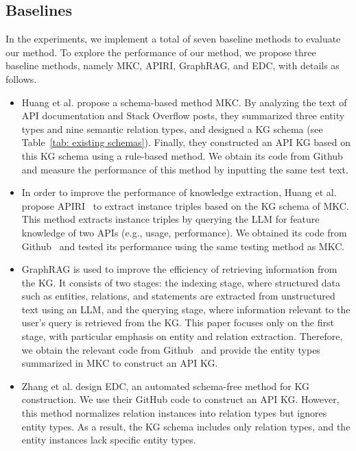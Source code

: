 \subsection{Baselines}\label{sec: baseline}
In the experiments, we implement a total of seven baseline methods to evaluate our method.
To explore the performance of our method, we propose three baseline methods, namely MKC, APIRI, GraphRAG, and EDC, with details as follows.
\begin{itemize}[leftmargin=*]
    \item Huang et al. \cite{Manual} propose a schema-based method MKC.
    By analyzing the text of API documentation and Stack Overflow posts, they summarized three entity types and nine semantic relation types, and designed a KG schema (see Table~\ref{tab: existing schemas}).
    Finally, they constructed an API KG based on this KG schema using a rule-based method. 
    We obtain its code from Github~\cite{yuangit} and measure the performance of this method by inputting the same test text.
    \item In order to improve the performance of knowledge extraction, Huang et al. propose APIRI~\cite{yanbang2} to extract instance triples based on the KG schema of MKC.
    This method extracts instance triples by querying the LLM for feature knowledge of two APIs (e.g., usage, performance).
    We obtained its code from Github~\cite{APIRICGIT} and tested its performance using the same testing method as MKC.
    \item GraphRAG \cite{GraphRAG} is used to improve the efficiency of retrieving information from the KG.
    It consists of two stages: the indexing stage, where structured data such as entities, relations, and statements are extracted from unstructured text using an LLM, and the querying stage, where information relevant to the user's query is retrieved from the KG.
    This paper focuses only on the first stage, with particular emphasis on entity and relation extraction. 
    Therefore, we obtain the relevant code from Github~\cite{graphraggit} and provide the entity types summarized in MKC to construct an API KG.
    \item Zhang et al.\cite{EDC} design EDC, an automated schema-free method for KG construction. 
    We use their GitHub code\cite{edcgit} to construct an API KG. 
    However, this method normalizes relation instances into relation types but ignores entity types. 
    As a result, the KG schema includes only relation types, and the entity instances lack specific entity types.
\end{itemize}


